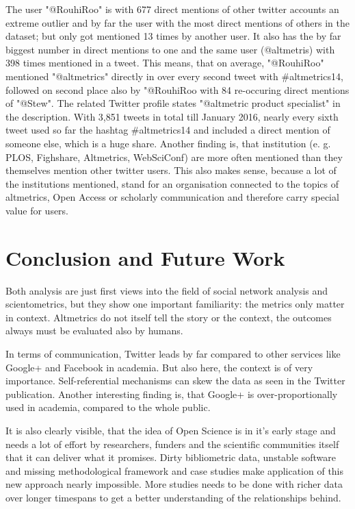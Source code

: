 \documentclass[fleqn,10pt,lineno]{wlpeerj} %
\begin{document}
The user "@RouhiRoo" is with 677 direct mentions of other twitter accounts an extreme outlier and by far the user with the most direct mentions of others in the dataset; but only got mentioned 13 times by another user. It also has the by far biggest number in direct mentions to one and the same user (@altmetris) with 398 times mentioned in a tweet. This means, that on average, "@RouhiRoo" mentioned "@altmetrics" directly in over every second tweet with \#altmetrics14, followed on second place also by "@RouhiRoo with 84 re-occuring direct mentions of "@Stew". The related Twitter profile states "@altmetric product specialist" in the description. With 3,851 tweets in total till January 2016, nearly every sixth tweet used so far the hashtag \#altmetrics14 and included a direct mention of someone else, which is a huge share. 
Another finding is, that institution (e. g. PLOS, Fighshare, Altmetrics, WebSciConf) are more often mentioned than they themselves mention other twitter users. This also makes sense, because a lot of the institutions mentioned, stand for an organisation connected to the topics of altmetrics, Open Access or scholarly communication and therefore carry special value for users.

\section*{Conclusion and Future Work}

Both analysis are just first views into the field of social network analysis and scientometrics, but they show one important familiarity: the metrics only matter in context. Altmetrics do not itself tell the story or the context, the outcomes always must be evaluated also by humans.

In terms of communication, Twitter leads by far compared to other services like Google+ and Facebook in academia. But also here, the context is of very importance. Self-referential mechanisms can skew the data as seen in the Twitter publication. Another interesting finding is, that Google+ is over-proportionally used in academia, compared to the whole public. 

It is also clearly visible, that the idea of Open Science is in it's early stage and needs a lot of effort by researchers, funders and the scientific communities itself that it can deliver what it promises. Dirty bibliometric data, unstable software and missing methodological framework and case studies make application of this new approach nearly impossible. More studies needs to be done with richer data over longer timespans to get a better understanding of the relationships behind. 
\end{document}
